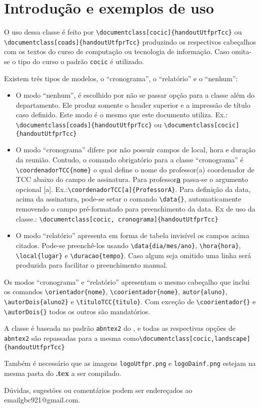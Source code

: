 \documentclass[cocic]{handoutUtfprTcc}
\begin{document}
\imprimircapa

\section{Introdução e exemplos de uso}
	O uso dessa classe é feito por \verb|\documentclass[cocic]{handoutUtfprTcc}| ou \verb|\documentclass[coads]{handoutUtfprTcc}| produzindo os respectivos cabeçalhos com os textos do curso de computação ou tecnologia de informação. Caso omita-se o tipo do curso o padrão \verb|cocic| é utilizado.
	
	Existem três tipos de modelos, o ``cronograma'', o ``relatório'' e o ``nenhum'':
	\begin{itemize}
		\item	O modo ``nenhum'', é escolhido por não se passar opção para a classe além do departamento. Ele produz somente o header superior e a impressão de título caso definido. Este modo é o mesmo que este documento utiliza. Ex.: \verb|\documentclass[coads]{handoutUtfprTcc}| ou
		\newline\verb|\documentclass[cocic]{handoutUtfprTcc}|
		
		\item	O modo ``cronograma'' difere por não possuir campos de local, hora e duração da reunião. Contudo, o comando obrigatório para a classe ``cronograma'' é \verb|\coordenadorTCC{nome}| o qual define o nome do professor(a) coordenador de TCC abaixo do campo de assinatura. Para professor\textbf{\underline{a}} passa-se o argumento opcional [a]. Ex.:\verb|\coordenadorTCC[a]{ProfessorA}|. Para definição da data, acima da assinatura, pode-se setar o comando \verb|\data{}|, automaticamente removendo o campo pré-formatado para preenchimento da data. Ex de uso da classe.:
		\newline\verb|\documentclass[cocic, cronograma]{handoutUtfprTcc}|
		
		\item	O modo ``relatório'' apresenta em forma de tabela invisível os campos acima citados. Pode-se preenchê-los usando \verb|\data{dia/mes/ano}|, \verb|\hora{hora}|, \verb|\local{lugar}| e \verb|\duracao{tempo}|. Caso algum seja omitido uma linha será produzida para facilitar o preenchimento manual.
	\end{itemize}
	
	Os modos ``cronograma'' e ``relatório'' apresentam o mesmo cabeçalho que inclui os comandos \verb|\orientador{nome}|, \verb|\coorientador{nome}|, \verb|autor{aluno}|, \verb|\autorDois{aluno2}| e \verb|\tituloTCC{titulo}|. Com exceção de \newline\verb|\coorientador{}| e \verb|\autorDois{}| todos os outros são mandatórios.
	
	A classe é baseada no padrão \verb|abntex2| do \LaTeXe, e todas as respectivas opções de \verb|abntex2| são repassadas para a mesma como\newline \verb|\documentclass[cocic,landscape]{handoutUtfprTcc}|
	
	Também é necessário que as imagens \verb|logoUtfpr.png| e \verb|logoDainf.png| estejam na mesma pasta do \textbf{.tex} a ser compilado.

	Dúvidas, sugestões ou comentários podem ser endereçados ao email\newline gbc921@gmail.com.
\end{document}
